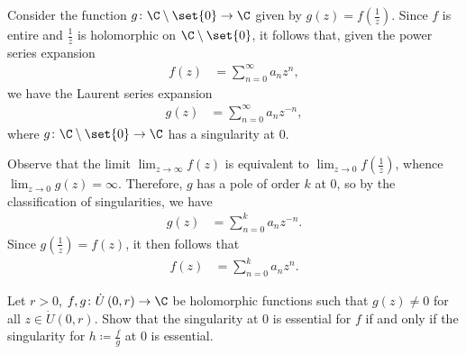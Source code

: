 \documentclass[11pt]{mypackage}
\begin{document}
\begin{solution}
  Consider the function $g\colon \C\setminus \set{0} \rightarrow \C$ given by $g(z) = f\left( \frac{1}{z} \right)$. Since $f$ is entire and $\frac{1}{z}$ is holomorphic on $\C\setminus \set{0}$, it follows that, given the power series expansion
  \begin{align*}
    f(z) &= \sum_{n=0}^{\infty}a_nz^{n},
  \end{align*}
  we have the Laurent series expansion
  \begin{align*}
    g(z) &= \sum_{n=0}^{\infty}a_nz^{-n},
  \end{align*}
  where $g\colon \C\setminus \set{0}\rightarrow \C$ has a singularity at $0$.\newline

  Observe that the limit $\lim_{z\rightarrow\infty} f(z)$ is equivalent to $\lim_{z\rightarrow 0}f\left( \frac{1}{z} \right)$, whence $\lim_{z\rightarrow 0} g(z) = \infty$. Therefore, $g$ has a pole of order $k$ at $0$, so by the classification of singularities, we have
  \begin{align*}
    g(z) &= \sum_{n=0}^{k}a_nz^{-n}.
  \end{align*}
  Since $g\left( \frac{1}{z} \right) = f(z)$, it then follows that
  \begin{align*}
    f(z) &= \sum_{n=0}^{k} a_nz^{n}.
  \end{align*}
\end{solution}
\begin{problem}[Problem 5]
  Let $r > 0$, $f,g\colon \dot{U}\left( 0,r \right)\rightarrow \C$ be holomorphic functions such that $g(z)\neq 0$ for all $z\in \dot{U}\left( 0,r \right)$. Show that the singularity at $0$ is essential for $f$ if and only if the singularity for $h \coloneq \frac{f}{g}$ at $0$ is essential.
\end{problem}
\end{document}
